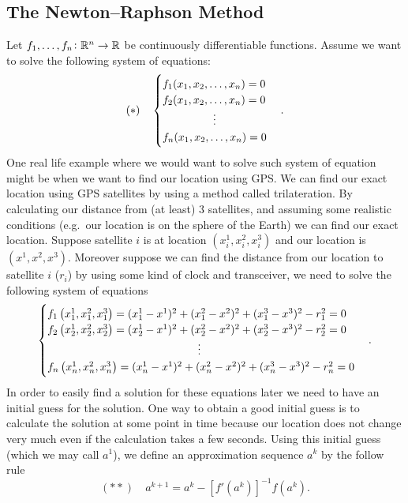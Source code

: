 \documentclass[11pt,a4paper]{article}
\begin{document}
\subsection{The Newton--Raphson Method}
Let $f_1,\dots,f_n \colon \mathbb{R}^n \to \mathbb{R}$ be continuously differentiable
functions.
Assume we want to solve the following system of equations:
\[
  (*) \quad \begin{cases}
    f_1(x_1,x_2,\dots,x_n) = 0 \\
    f_2(x_1,x_2,\dots,x_n) = 0 \\
    \vdotswithin{f_n(x_1,x_2,\dots,x_n) = 0} \\
    f_n(x_1,x_2,\dots,x_n) = 0
  \end{cases}.
\]
One real life example where we would want to solve such system of equation
might be when we want to find our location using GPS.
We can find our exact location using GPS satellites by using a method
called trilateration.
By calculating our distance from (at least) $3$ satellites, and assuming
some realistic conditions (e.g.\ our location is on the sphere of the Earth)
we can find our exact location.
Suppose satellite $i$ is at location $(x_i^1,x_i^2,x_i^3)$ and our location
is $(x^1,x^2,x^3)$.
Moreover suppose we can find the distance from our location to satellite $i$
($r_i$) by using some kind of clock and transceiver,
we need to solve the following system of equations
\[
  \begin{cases}
    f_1\del{x_1^1,x_1^2,x_1^3} =
      (x_1^1 - x^1)^2 + (x_1^2 - x^2)^2 + (x_1^3 - x^3)^2 - r_1^2 = 0 \\
    f_2\del{x_2^1,x_2^2,x_2^3} =
      (x_2^1 - x^1)^2 + (x_2^2 - x^2)^2 + (x_2^3 - x^3)^2 - r_2^2 = 0 \\
      \vdotswithin{f_n(x_n^1,x_n^2,x_n^3) =
      (x_n^1 - x^1)^2 + (x_n^2 - x^2)^2 + (x_n^3 - x^3)^2 - r_n^2 = 0} \\
    f_n\del{x_n^1,x_n^2,x_n^3} =
      (x_n^1 - x^1)^2 + (x_n^2 - x^2)^2 + (x_n^3 - x^3)^2 - r_n^2 = 0 \\
  \end{cases}.
\]
In order to easily find a solution for these equations later we need to have
an initial guess for the solution.
One way to obtain a good initial guess is to calculate the solution
at some point in time because our location does not change very much even
if the calculation takes a few seconds.
Using this initial guess (which we may call $a^1$),
we define an approximation sequence $a^k$ by the follow rule
\[
  (**) \quad a^{k+1} = a^k - \left[f'(a^k)\right]^{-1} f(a^k).
\]
\end{document}
